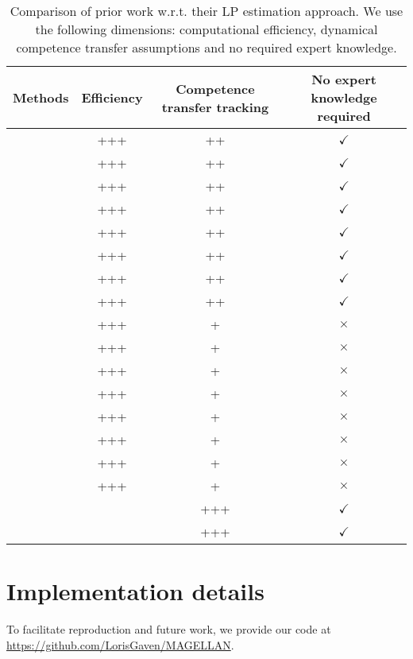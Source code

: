 \begin{table}[h!] 
\centering 
\small
\begin{tabular}{|l|c|c|c|}
\hline
\textbf{Methods} & \textbf{Efficiency} & \textbf{Competence transfer tracking} & \textbf{No expert knowledge required} \\ 
\hline 
\cite{oudeyer_intrinsic_2007} & +++ & ++ & $\checkmark$ \\ 
\cite{baranes_r-iac_2009} & +++ & ++ & $\checkmark$ \\ 
\cite{baranes_active_2013} & +++ & ++ & $\checkmark$ \\ 
\cite{moulin-frier_exploration_2013} & +++ & ++ & $\checkmark$ \\ 
\cite{moulin-frier_self-organization_2014} & +++ & ++ & $\checkmark$ \\ 
\cite{portelas_teacher_2019} & +++ & ++ & $\checkmark$ \\ 
\cite{forestier_modular_2016} & +++ & ++ & $\checkmark$ \\ 
\cite{kovac_grimgep_2023} & +++ & ++ & $\checkmark$ \\ 
\hline 
\cite{stout_competence_2010} & +++ & + & $\times$ \\ 
\cite{lopes_strategic_2012} & +++ & + & $\times$ \\ 
\cite{matiisen_teacher-student_2017} & +++ & + & $\times$ \\ 
\cite{fournier_accuracy-based_2018} & +++ & + & $\times$ \\ 
\cite{colas_curious_2019} & +++ & + & $\times$ \\ 
\cite{blaes_control_2019} & +++ & + & $\times$ \\ 
\cite{akakzia_grounding_2021} & +++ & + & $\times$ \\ 
\cite{kumar_practice_2024} & +++ & + & $\times$ \\ 
\hline 
\cite{kanitscheider_multi-task_2021} & & +++ & $\checkmark$ \\ 
\cite{zhang_omni_2024} & & +++ & $\checkmark$ \\ 
\hline 
\end{tabular}
\caption{Comparison of prior work w.r.t. their LP estimation approach. We use the following dimensions: computational efficiency, dynamical competence transfer assumptions and no required expert knowledge.} 
\label{tab:table_lp_literature}
\end{table}

\newpage
\section{Implementation details} \label{app:implementation_details}
To facilitate reproduction and future work, we provide our code at \url{https://github.com/LorisGaven/MAGELLAN}.

